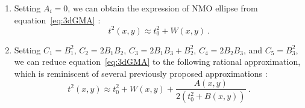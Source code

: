 \begin{enumerate}
\item Setting $A_i = 0$, we can obtain the expression of NMO ellipse from equation~\ref{eq:3dGMA} \cite[]{nmoellipse}:
\begin{equation}
    t^2(x,y) \approx t^2_0 + W(x,y)~.
\end{equation}
\item Setting $C_1=B^2_1$, $C_2=2B_1B_2$, $C_3=2B_1B_3 + B^2_2$, $C_4=2B_2B_3$, and $C_5=B^2_3$, we can reduce equation~\ref{eq:3dGMA} to the following rational approximation, which is reminiscent of several previously proposed approximations \cite[]{tsvankinthomsen1994,ursin}:
\begin{equation}
\label{eq:rational}
    t^2(x,y) \approx t^2_0 + W(x,y) + \frac{A(x,y)}{2\left(t^2_0+B(x,y)\right)} ~.
\end{equation}
 


\end{enumerate}
